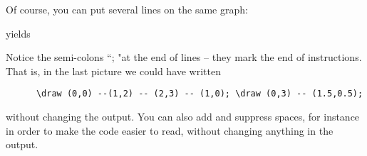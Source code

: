 %
%
\begin{frame}[fragile]

  Of course, you can put several lines on the same graph:

  

  yields

  \begin{center}
    
  \end{center}
  
  Notice the semi-colons ``; "at the end of lines -- they mark the end of instructions. That is, in the last picture we could have written

  {
    \footnotesize
    \begin{lstlisting}
      \draw (0,0) --(1,2) -- (2,3) -- (1,0); \draw (0,3) -- (1.5,0.5);
    \end{lstlisting}
  }
  
  without changing the output. You can also add and suppress spaces, for instance in order to make the code easier to read, without changing anything in the output.

\end{frame}

